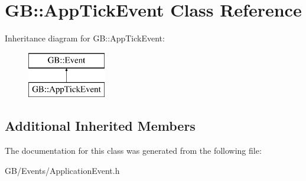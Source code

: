 \hypertarget{class_g_b_1_1_app_tick_event}{}\section{GB\+::App\+Tick\+Event Class Reference}
\label{class_g_b_1_1_app_tick_event}
Inheritance diagram for GB\+::App\+Tick\+Event\+:\begin{figure}[H]
\begin{center}
\leavevmode
\includegraphics[height=2.000000cm]{class_g_b_1_1_app_tick_event}
\end{center}
\end{figure}
\subsection*{Additional Inherited Members}


The documentation for this class was generated from the following file\+:\begin{DoxyCompactItemize}
\item 
G\+B/\+Events/Application\+Event.\+h\end{DoxyCompactItemize}
